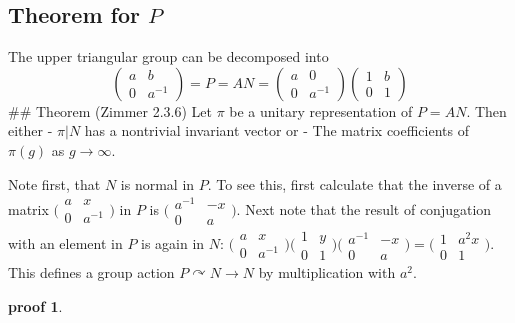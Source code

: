 \documentclass[
  12pt
]{article}
\theoremstyle{break}
\theoremstyle{plain}
\newtheorem*{pf}{proof}
\newcommand{\ipmatrix}[1]{%
\ensuremath{\big(\begin{smallmatrix} #1 \end{smallmatrix}\big)}}
\begin{document}
  \hypertarget{theorem-for-p}{%
  \subsection{Theorem for \texorpdfstring{$P$}{P}}\label{theorem-for-p}}

  The upper triangular group can be decomposed into
  \[\begin{pmatrix}a & b \\ 0 & a^{-1}\end{pmatrix} =
  P = AN =
  \begin{pmatrix}a & 0 \\ 0 & a^{-1}\end{pmatrix} \begin{pmatrix}1 & b \\ 0 & 1\end{pmatrix}\]
  \#\# Theorem (Zimmer 2.3.6) Let $\pi$ be a unitary representation of
  $P = AN$. Then either - $\pi|N$ has a nontrivial invariant vector or
  - The matrix coefficients of $\pi(g)$ as $g \rightarrow \infty$.

  Note first, that $N$ is normal in $P$. To see this, first calculate that the
  inverse of a matrix $\ipmatrix{ a & x \\ 0 & a^{-1} }$ in $P$ is $\ipmatrix{
  a^{-1} & -x \\ 0 & a }$. Next note that the result of conjugation with an
  element in $P$ is again in $N$: $\ipmatrix{ a & x \\ 0 & a^{-1} } \ipmatrix{1 &
  y \\ 0 & 1} \ipmatrix{ a^{-1} & -x \\ 0 & a } = \ipmatrix{1 & a^2x \\ 0 & 1}$.
  This defines a group action $P \curvearrowright N \rightarrow N$ by
  multiplication with $a^2$.

  \begin{pf}
    
  \end{pf}
\end{document}
